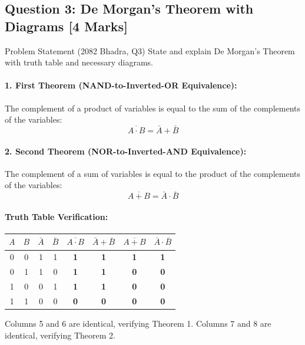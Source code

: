 \documentclass[11pt,a4paper,oneside]{book}
\begin{document}
\subsection{Question 3: De Morgan's Theorem with Diagrams [4 Marks]}
\begin{questionbox}{Problem Statement (2082 Bhadra, Q3)}
State and explain De Morgan's Theorem with truth table and necessary diagrams.
\end{questionbox}

\paragraph{1. First Theorem (NAND-to-Inverted-OR Equivalence):}
The complement of a product of variables is equal to the sum of the complements of the variables:
\[
\overline{A \cdot B} = \bar{A} + \bar{B}
\]

\paragraph{2. Second Theorem (NOR-to-Inverted-AND Equivalence):}
The complement of a sum of variables is equal to the product of the complements of the variables:
\[
\overline{A + B} = \bar{A} \cdot \bar{B}
\]

\paragraph{Truth Table Verification:}
\begin{center}
\begin{tabular}{|cc|cc|c|c||c|c|}
\hline
$A$ & $B$ & $\bar{A}$ & $\bar{B}$ & $\overline{A \cdot B}$ & $\bar{A} + \bar{B}$ & $\overline{A + B}$ & $\bar{A} \cdot \bar{B}$ \\ \hline
0 & 0 & 1 & 1 & \textbf{1} & \textbf{1} & \textbf{1} & \textbf{1} \\ \hline
0 & 1 & 1 & 0 & \textbf{1} & \textbf{1} & \textbf{0} & \textbf{0} \\ \hline
1 & 0 & 0 & 1 & \textbf{1} & \textbf{1} & \textbf{0} & \textbf{0} \\ \hline
1 & 1 & 0 & 0 & \textbf{0} & \textbf{0} & \textbf{0} & \textbf{0} \\ \hline
\end{tabular}
\end{center}
Columns 5 and 6 are identical, verifying Theorem 1. Columns 7 and 8 are identical, verifying Theorem 2.
\end{document}
